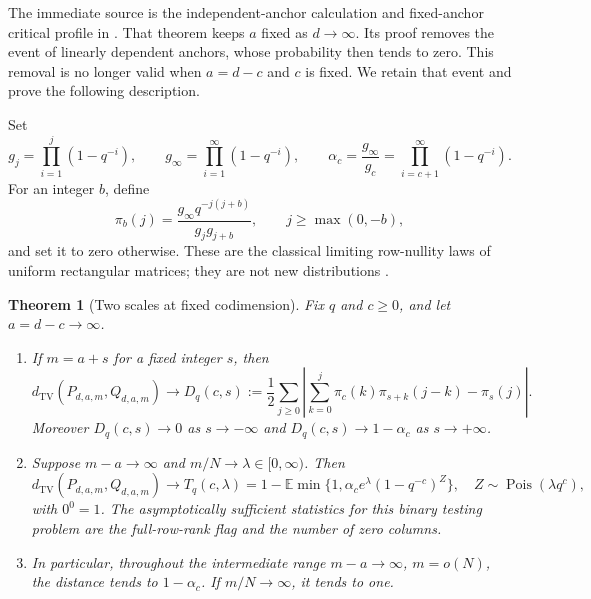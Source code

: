 \documentclass[11pt]{article}
\newtheorem{theorem}{Theorem}[section]
\theoremstyle{remark}\newtheorem{remark}[theorem]{Remark}
\newcommand{\E}{\mathbb E}
\newcommand{\TV}{d_{\mathrm{TV}}}
\newcommand{\Poi}{\operatorname{Pois}}
\begin{document}
The immediate source is the independent-anchor calculation and fixed-anchor critical profile in \cite[\S\texttt{spn:sec:many}, Proposition \texttt{spn:prop:anchors} and Theorem \texttt{spn:thm:anchors}]{ProveIt}. That theorem keeps $a$ fixed as $d\to\infty$. Its proof removes the event of linearly dependent anchors, whose probability then tends to zero. This removal is no longer valid when $a=d-c$ and $c$ is fixed. We retain that event and prove the following description.

Set
\begin{equation}\label{eq:products}
 g_j=\prod_{i=1}^j(1-q^{-i}),\qquad
 g_\infty=\prod_{i=1}^\infty(1-q^{-i}),\qquad
 \alpha_c=\frac{g_\infty}{g_c}=\prod_{i=c+1}^\infty(1-q^{-i}).
\end{equation}
For an integer $b$, define
\begin{equation}\label{eq:pi}
 \pi_b(j)=\frac{g_\infty q^{-j(j+b)}}{g_jg_{j+b}},
 \qquad j\ge\max(0,-b),
\end{equation}
and set it to zero otherwise. These are the classical limiting row-nullity laws of uniform rectangular matrices; they are not new distributions \cite{FulmanGoldstein}.

\begin{theorem}[Two scales at fixed codimension]\label{thm:two}
Fix $q$ and $c\ge0$, and let $a=d-c\to\infty$.
\begin{enumerate}
\item If $m=a+s$ for a fixed integer $s$, then
\[
 \TV(P_{d,a,m},Q_{d,a,m})\longrightarrow
 D_q(c,s):=\frac12\sum_{j\ge0}
 \left|\sum_{k=0}^j\pi_c(k)\pi_{s+k}(j-k)-\pi_s(j)\right|.
\]
Moreover $D_q(c,s)\to0$ as $s\to-\infty$ and $D_q(c,s)\to1-\alpha_c$ as $s\to+\infty$.
\item Suppose $m-a\to\infty$ and $m/N\to\lambda\in[0,\infty)$. Then
\begin{equation}\label{eq:poisson-profile}
 \TV(P_{d,a,m},Q_{d,a,m})\longrightarrow
 T_q(c,\lambda)=1-\E\min\{1,\alpha_c e^\lambda(1-q^{-c})^Z\},
 \quad Z\sim\Poi(\lambda q^c),
\end{equation}
with $0^0=1$. The asymptotically sufficient statistics for this binary testing problem are the full-row-rank flag and the number of zero columns.
\item In particular, throughout the intermediate range $m-a\to\infty$, $m=o(N)$, the distance tends to $1-\alpha_c$. If $m/N\to\infty$, it tends to one.
\end{enumerate}
\end{theorem}
\end{document}
